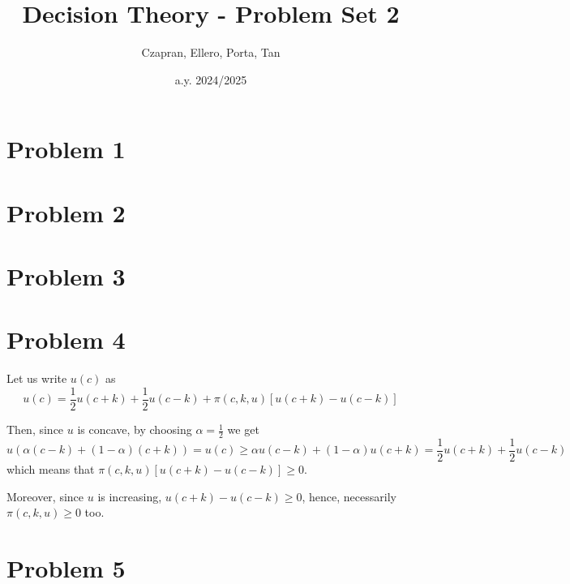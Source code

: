 \documentclass[12pt]{extarticle}
\title{Decision Theory - Problem Set 2}
\author{Czapran, Ellero, Porta, Tan}
\date{a.y. 2024/2025}
\numberwithin{table}{section}
\numberwithin{figure}{section}
\numberwithin{equation}{section}
\begin{document}
\maketitle

\section*{Problem 1}

\section*{Problem 2}

\section*{Problem 3}

\section*{Problem 4}

Let us write $u(c)$ as
\begin{equation}
    u(c) = \frac{1}{2} u(c + k) + \frac{1}{2} u(c-k) + \pi(c, k, u) [ u(c + k) - u(c-k)]
\end{equation}

Then, since $u$ is concave, by choosing $\alpha = \frac{1}{2}$ we get
\begin{equation}
    u(\alpha (c - k) + (1-\alpha) (c + k)) = u(c) \geq \alpha u(c - k) + (1-\alpha) u(c+k) = \frac{1}{2} u(c + k) + \frac{1}{2} u(c-k)
\end{equation}
which means that $\pi(c, k, u) [ u(c + k) - u(c-k)] \geq 0$.

Moreover, since $u$ is increasing, $u(c + k) - u(c-k) \geq 0$, hence, necessarily $\pi(c, k, u) \geq 0$ too.

\section*{Problem 5}
\end{document}
